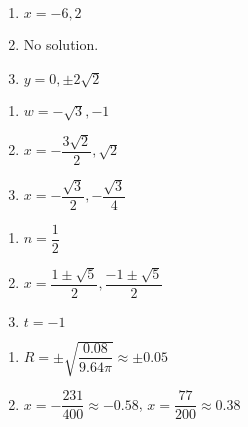 \documentclass{ximera}
\begin{document}
\begin{multicols}{3}
\begin{enumerate}
\setcounter{enumi}{\value{HW}}


\item $x=-6, 2$
\item No solution.
\item $y = 0, \pm 2\sqrt{2}$  

\setcounter{HW}{\value{enumi}}
\end{enumerate}
\end{multicols}

\begin{multicols}{3}
\begin{enumerate}
\setcounter{enumi}{\value{HW}}


\item $w = -\sqrt{3}, -1$
\item $x = -\dfrac{3\sqrt{2}}{2}, \sqrt{2}$
\item $x = -\dfrac{\sqrt{3}}{2}, -\dfrac{\sqrt{3}}{4}$

\setcounter{HW}{\value{enumi}}
\end{enumerate}
\end{multicols}


\begin{multicols}{3}
\begin{enumerate}
\setcounter{enumi}{\value{HW}}

\item $n = \dfrac{1}{2}$
\item $x = \dfrac{1 \pm \sqrt{5}}{2}, \dfrac{-1 \pm \sqrt{5}}{2}$
\item $t = -1$

\setcounter{HW}{\value{enumi}}
\end{enumerate}
\end{multicols}


\begin{multicols}{2}
\begin{enumerate}
\setcounter{enumi}{\value{HW}}


\item $R = \pm \sqrt{\dfrac{0.08}{9.64 \pi}} \approx \pm 0.05$ 
\item $x = -\dfrac{231}{400} \approx -0.58$, $x = \dfrac{77}{200} \approx 0.38$ 


\setcounter{HW}{\value{enumi}}
\end{enumerate}
\end{multicols}
\end{document}
